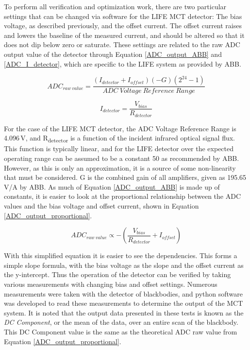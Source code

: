 To perform all verification and optimization work, there are two particular settings that can be changed via software for the LIFE MCT detector: The bias voltage, as described previously, and the offset current. The offset current raises and lowers the baseline of the measured current, and should be altered so that it does not dip below zero or saturate. These settings are related to the raw ADC output value of the detector through Equation \ref{ADC_output_ABB} and \ref{ADC_I_detector}, which are specific to the LIFE system as provided by ABB.

\begin{equation} \label{ADC_output_ABB}
    ADC_{raw\:value} = \frac{(I_{detector} + I_{offset})(-G)(2^{24}-1)}{ADC\:Voltage\:Reference\:Range}
\end{equation}

\begin{equation} \label{ADC_I_detector}
    I_{detector} = \frac{V_{bias}}{R_{detector}}
\end{equation}

For the case of the LIFE MCT detector, the ADC Voltage Reference Range is 4.096\,V, and R\textsubscript{detector} is a function of the incident infrared optical signal flux. This function is typically linear, and for the LIFE detector over the expected operating range can be assumed to be a constant 50 {\textOmega} as recommended by ABB. However, as this is only an approximation, it is a source of some non-linearity that must be considered. G is the combined gain of all amplifiers, given as 195.65 V/A by ABB. As much of Equation \ref{ADC_output_ABB} is made up of constants, it is easier to look at the proportional relationship between the ADC values and the bias voltage and offset current, shown in Equation \ref{ADC_output_proportional}.

\begin{equation} \label{ADC_output_proportional}
    ADC_{raw\:value} \propto -\left(\frac{V_{bias}}{R_{detector}} + I_{offset}\right)
\end{equation}

With this simplified equation it is easier to see the dependencies. This forms a simple slope formula, with the bias voltage as the slope and the offset current as the y-intercept. Thus the operation of the detector can be verified by taking various measurements with changing bias and offset settings. Numerous measurements were taken with the detector of blackbodies, and python software was developed to read these measurements to determine the output of the MCT system. It is noted that the output data presented in these tests is known as the \textit{DC Component}, or the mean of the data, over an entire scan of the blackbody. This DC Component value is the same as the theoretical ADC raw value from Equation \ref{ADC_output_proportional}.


